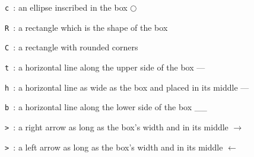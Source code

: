 \begin{description}
\item{ {\tt c }}: an ellipse inscribed in the box $\bigcirc$
\item{ {\tt R }}: a rectangle which is the shape of the box
\item{ {\tt C }}: a rectangle with rounded corners
\item{ {\tt t }}: a horizontal line along the upper side of the box ---
\item{ {\tt h }}: a horizontal line as wide as the box and placed in
its middle ---
\item{ {\tt b }}: a horizontal line along the lower side of the box \_\_

\item{ {\tt > }}: a right arrow as long as the box's width and in its
middle $\rightarrow$

\item{ {\tt > }}: a left arrow as long as the box's width and in its
middle $\leftarrow$


\end{description}
